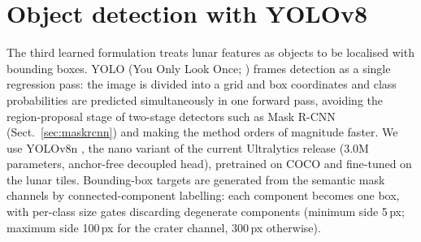 \section{Object detection with YOLOv8}
\label{sec:yolo}

The third learned formulation treats lunar features as objects to be localised with bounding boxes. YOLO (You Only Look Once; \citealt{redmon2016yolo}) frames detection as a single regression pass: the image is divided into a grid and box coordinates and class probabilities are predicted simultaneously in one forward pass, avoiding the region-proposal stage of two-stage detectors such as Mask R-CNN (Sect.~\ref{sec:maskrcnn}) and making the method orders of magnitude faster. We use YOLOv8n \citep{jocher2023yolov8}, the nano variant of the current Ultralytics release (3.0M parameters, anchor-free decoupled head), pretrained on COCO and fine-tuned on the lunar tiles. Bounding-box targets are generated from the semantic mask channels by connected-component labelling: each component becomes one box, with per-class size gates discarding degenerate components (minimum side 5\,px; maximum side 100\,px for the crater channel, 300\,px otherwise).
